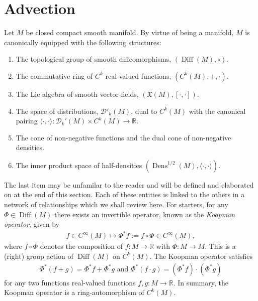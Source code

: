 \documentclass[12pt]{amsart}
\newcommand{\R}{\ensuremath{\mathbb{R}}}
\DeclareMathOperator{\Diff}{Diff}
\DeclareMathOperator{\Dens}{Dens}
\begin{document}
\section{Advection}
\label{sec:advection}
Let $M$ be closed compact smooth manifold.
By virtue of being a manifold, $M$ is canonically equipped with the following structures:
\begin{enumerate}
	\item The topological group of smooth diffeomorphisms, $(\Diff(M), \circ)$.
	\item The commutative ring of $C^k$ real-valued functions, $(C^k(M), + , \cdot)$.
	\item The Lie algebra of smooth vector-fields, $(\mathfrak{X}(M) , [ \cdot , \cdot ])$.
	\item The space of distributions, $\mathcal{D}'_k(M)$, dual to $C^k(M)$
	with the canonical pairing $\langle \cdot , \cdot \rangle : \mathcal{D}_k'(M) \times C^k(M) \to \R$.
	\item The cone of non-negative functions and the dual cone of non-negative densities.
	\item The inner product space of half-densities $(\Dens^{1/2}(M), \langle \cdot , \cdot \rangle)$.
\end{enumerate}
The last item may be unfamilar to the reader and will be defined and elaborated on at the end of this section.
Each of these entities is linked to the others in a network of relationships
which we shall review here.
For starters, for any $\Phi \in \Diff(M)$ there exists an invertible operator, known as the \emph{Koopman operator}, given by
\begin{align*}
	f \in C^\infty(M) \mapsto \Phi^* f := f \circ \Phi \in C^\infty(M),
\end{align*}
where $f \circ \Phi$ denotes the composition of $f:M \to \R$ with $\Phi:M \to M$.
This is a (right) group action of $\Diff(M)$ on $C^k(M)$.
The Koopman operator satisfies
\begin{align*}
	\Phi^*(f+g) = \Phi^*f + \Phi^*g \text{ and } \Phi^*(f\cdot g) = (\Phi^*f) \cdot (\Phi^*g)
\end{align*}
for any two functions real-valued functions $f,g: M \to \mathbb{R}$.
In summary, the Koopman operator is a ring-automorphism of $C^k(M)$.
\end{document}
